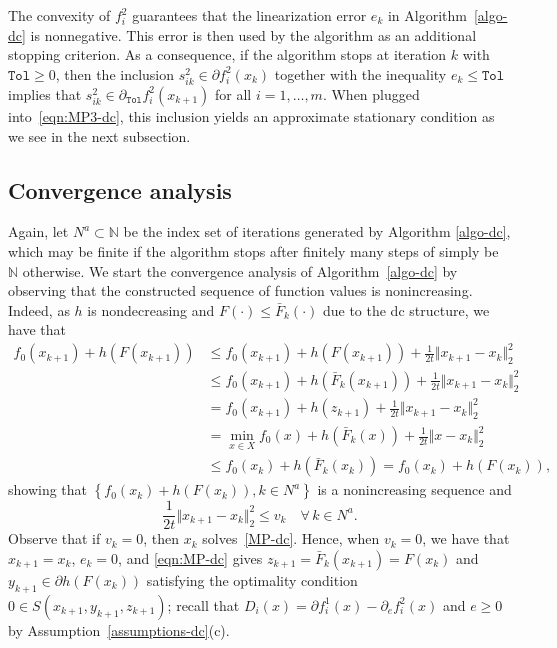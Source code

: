 \documentclass[smallextended,envcountsect]{svjour3}
\newcommand{\norm}[1]{\textstyle{\Vert} #1 \textstyle{\Vert}_2}
\newcommand{\col}[1]{\left\{#1\right\}}
\newcommand{\tol}{\texttt{Tol}}
\newcommand{\nats}{\mathbb{N}}
\begin{document}
The convexity of $f_i^2$ guarantees that the linearization error $e_k$ in Algorithm~\ref{algo-dc} is nonnegative. This error is then used by the algorithm as an additional stopping criterion. As a consequence, if the algorithm stops at iteration $k$ with $\tol \geq 0$, then the inclusion $s_{ik}^2 \in \partial f_i^2(x_k)$ together with the inequality $e_k \le \tol$ implies that $s_{ik}^2 \in \partial_{\tol} f_i^2(x_{k+1})$ for all $i = 1,\ldots,m$. When plugged into~\eqref{eqn:MP3-dc}, this inclusion yields an approximate stationary condition as we see in the next subsection.
\subsection{Convergence analysis}
Again, let $N^a \subset \nats$ be the index set of iterations generated by Algorithm \ref{algo-dc}, which may be finite if the algorithm stops after finitely many steps of simply be $\nats$ otherwise.
We start the convergence analysis of Algorithm~\ref{algo-dc} by observing that the constructed sequence of function values is nonincreasing. Indeed, as $h$ is nondecreasing and $F(\cdot)\leq \bar F_k(\cdot)$ due to the dc structure, we have that
\begin{align}
 f_0(x_{k+1})+h(F(x_{k+1})) &\leq  f_0(x_{k+1})+h(F(x_{k+1})) + \frac{1}{2t}\norm{x_{k+1}- x_k}^2
 \nonumber \\
 &\leq  f_0(x_{k+1})+h(\bar F_k(x_{k+1})) +  \frac{1}{2t}\norm{x_{k+1}-x_k}^2 \label{eq:dc-aux1}\\
 &=  f_0(x_{k+1})+h(z_{k+1}) + \frac{1}{2t}\norm{x_{k+1}- x_k}^2\nonumber\\ 
&  =\min_{x \in X} f_0(x)+h(\bar F_k(x)) + \frac{1}{2t}\norm{x- x_k}^2 \nonumber\\
& \leq f_0(x_{k})+h(\bar F_k(x_{k}))= f_0(x_{k})+h(F(x_{k})),\nonumber
\end{align}
showing that $\col{f_0(x_{k})+h(F(x_{k})), k\in N^a}$ is a nonincreasing sequence and
\[
 \frac{1}{2t}\norm{x_{k+1}- x_k}^2\leq v_k \quad \forall\,k \in N^a.
\]
Observe that if $v_k =0$, then $x_k$ solves~\eqref{MP-dc}. Hence, when $v_k =0$, we have that $x_{k+1}=x_k$, $e_k=0$, and \eqref{eqn:MP-dc} gives $z_{k+1}=\bar F_k(x_{k+1})=F(x_k)$ and $y_{k+1} \in \partial h(F(x_k))$ satisfying the optimality condition $0 \in S(x_{k+1},y_{k+1},z_{k+1})$; recall that $D_i(x)=\partial f_i^1(x)-\partial_e f_i^2(x)$ and $e\geq 0$ by Assumption~\ref{assumptions-dc}(c).
\end{document}
